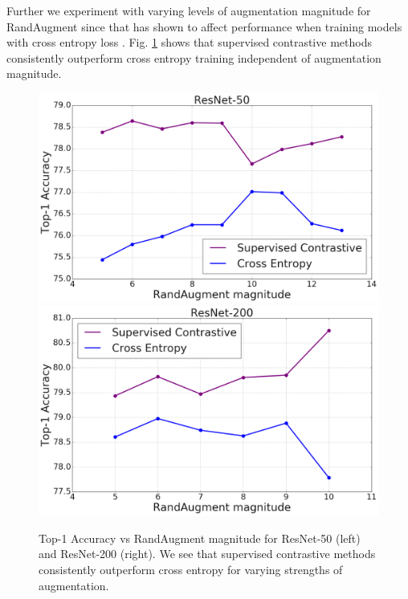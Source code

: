 Further we experiment with varying levels of augmentation magnitude for RandAugment since that has shown to affect performance when training models with cross entropy loss \cite{cubuk2019randaugment}. Fig. \ref{fig:randaug} shows that supervised contrastive methods consistently outperform cross entropy training independent of augmentation magnitude.


\begin{figure}[h!]
    \centering
    \includegraphics[width=0.45\linewidth]{figs/randaug50.png}
    \includegraphics[width=0.45\linewidth]{figs/randaug200.png}
    \caption{Top-1 Accuracy vs RandAugment magnitude for ResNet-50 (left) and ResNet-200 (right). We see that supervised contrastive methods consistently outperform cross entropy for varying strengths of augmentation.}
    \label{fig:randaug} 
\end{figure}















































    


















 












